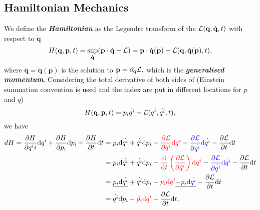 \documentclass{article}
\theoremstyle{nonumberplain}
\begin{document}
\subsection{Hamiltonian Mechanics}
We define the \textit{\textbf{Hamiltonian}} as the Legendre transform of the $ \mathcal{\MakeUppercase{L}}(\mathbf{q} ,\dot{\mathbf{q} }, t)$ with respect to $\dot{\mathbf{q}}$
\[
    H(\mathbf{q} ,\mathbf{p} ,t) 
    = \sup_{\mathbf{\dot{q}} } (\mathbf{p} \cdot \dot{\mathbf{q} } - \mathcal{\MakeUppercase{L}} )
    = \mathbf{p} \cdot \dot{\mathbf{q} }(\mathbf{p} ) - \mathcal{\MakeUppercase{L}}(\mathbf{q} , \dot{\mathbf{q} }(\mathbf{p} ), t),
\]
where $\dot{\mathbf{q} } = \dot{\mathbf{q} }(\mathbf{p} )$ is the solution to $\mathbf{p} = \partial_{\dot{\mathbf{q} }}\mathcal{\MakeUppercase{L}},$ which is the \textit{\textbf{generalised momentum}}.  
Considering the total derivative of both sides of (Einstein summation convention is used and the index are put in different locations for $p$ and $q$)
\[
    H(\mathbf{q} , \mathbf{p} , t) = p_i \dot{q^i} - \mathcal{\MakeUppercase{L}}(q^i, \dot{q^i}, t),
\]
we have 
\[
    \begin{aligned}
    dH 
    = \frac{\partial H}{\partial q^ii} \mathrm{d} q^i + \frac{\partial H}{\partial p_i} \mathrm{d} p_i + \frac{\partial H}{\partial t} \mathrm{d} t %
    &= p_i \mathrm{d} \dot{q^i} + \dot{q^i} \mathrm{d} p_i 
    - \textcolor{red}{\frac{\partial \mathcal{\MakeUppercase{L}} }{\partial q^i} \mathrm{d} q^i}
    - \textcolor{blue}{\frac{\partial \mathcal{\MakeUppercase{L}} }{\partial \dot{q^i}} \mathrm{d} \dot{q^i}}
    - \frac{\partial \mathcal{\MakeUppercase{L}} }{\partial t} \mathrm{d} t \\
    &= p_i \mathrm{d} \dot{q^i} + \dot{q^i} \mathrm{d} p_i 
    - \textcolor{red}{\frac{\mathrm{d}}{\mathrm{d}t} \left( \frac{\partial \mathcal{\MakeUppercase{L}} }{\partial \dot{q}^i} \right) \mathrm{d} q^i}
    - \textcolor{blue}{\frac{\partial \mathcal{\MakeUppercase{L}} }{\partial \dot{q^i}} \mathrm{d} \dot{q^i}}
    - \frac{\partial \mathcal{\MakeUppercase{L}} }{\partial t} \mathrm{d} t \\ 
    &= \underline{p_i \mathrm{d} \dot{q^i}} + \dot{q^i} \mathrm{d} p_i 
    - \textcolor{red}{\dot{p_i} \mathrm{d} q^i}
    \underline{- \textcolor{blue}{p_i \mathrm{d} \dot{q^i}}}
    - \frac{\partial \mathcal{\MakeUppercase{L}} }{\partial t} \mathrm{d} t \\ 
    &= \dot{q^i} \mathrm{d} p_i 
    - \textcolor{red}{\dot{p_i} \mathrm{d} q^i }
    - \frac{\partial \mathcal{\MakeUppercase{L}} }{\partial t} \mathrm{d} t,
    \end{aligned}
\]
\end{document}
